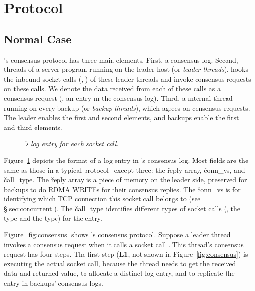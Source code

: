\section{Protocol} \label{sec:protocol}

\subsection{Normal Case} \label{sec:normal}
\xxx's consensus protocol has three main elements. 
First, a \paxos consensus log. Second, threads of a server program running on 
the leader host (or \emph{leader threads}). \xxx hooks the inbound socket calls 
(\eg, \recv) of these leader threads and invoke consensus requests on these 
calls. We denote the data received from each of these calls as a consensus 
request (\ie, an entry in the consensus log). Third, a \xxx internal thread 
running on every backup (or \emph{backup threads}), which agrees on consensus 
requests. The \xxx leader enables the first and second elements, and backups 
enable the first and third elements.

\begin{figure}[h]
\begin{minipage}{3in}
\end{minipage}
\caption{{\em \xxx's log entry for each socket call.}}
\label{fig:logentry}
\end{figure}

Figure~\ref{fig:logentry} depicts the format of a log entry in \xxx's consensus 
log. Most fields are the same as those in a typical \paxos 
protocol~\cite{paxos:practical} except three: the \v{reply} array, 
\v{conn\_vs}, and \v{call\_type}. 
The \v{reply} array is a piece of memory on the leader side, preserved for
backups to do RDMA WRITEs for their consensus replies. 
The \v{conn\_vs} is for identifying
which TCP connection this socket call belongs to (see \S\ref{sec:concurrent}). 
The \v{call\_type} identifies different types of socket calls (\eg, the \accept 
type and the \recv type) for the entry.

Figure~\ref{fig:consensus} shows \xxx's consensus protocol. Suppose a leader 
thread invokes a consensus request when it calls a socket call \recv. This 
thread's consensus request has four steps. The first step (\textbf{L1}, not 
shown in Figure~\ref{fig:consensus}) is executing the actual socket call, 
because the thread needs to get the received data and returned value, to 
allocate a distinct log entry, and to replicate the entry in backups' consensus 
logs.

